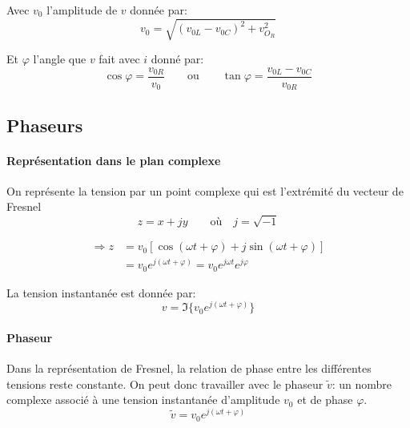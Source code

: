 \begin{multicols*}{2}
    Avec $v_0$ l'amplitude de $v$ donnée par:
    \[ v_0 = \sqrt{(v_{0L} - v_{0C})^2 + v_{O_R}^2} \]
    
    Et $\varphi$ l'angle que $v$ fait avec $i$ donné par:
    \[ \cos \varphi = \frac{v_{0R}}{v_0} \qquad \text{ou} \qquad \tan \varphi = \frac{v_{0L}-v_{0C}}{v_{0R}}  \]
    
    \subsection{Phaseurs}
    
    \paragraph{Représentation dans le plan complexe}
    On représente la tension par un point complexe qui est l'extrémité du vecteur de Fresnel
    \[ z = x + jy \qquad \text{où} \quad j = \sqrt{-1} \]
    
    \begin{center}
    \end{center}
    \begin{align*}
        \Rightarrow z &= v_0[\cos(\omega t + \varphi) + j \sin(\omega t + \varphi)] \\
        &= v_0 e^{j(\omega t + \varphi)} = v_0 e^{j\omega t} e^{j \varphi}
    \end{align*}
    
    La tension instantanée est donnée par:
    \[v = \Im \{ v_0 e^{j(\omega t + \varphi)} \} \]
    
    \paragraph{Phaseur} Dans la représentation de Fresnel, la relation de phase entre les différentes tensions reste constante. On peut donc travailler avec le phaseur $\tilde{v}$: un nombre complexe associé à une tension instantanée d'amplitude $v_0$ et de phase $\varphi$.
    \[ \tilde{v} = v_0 e^{j(\omega t + \varphi)} \]
    

\end{multicols*}
